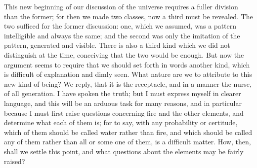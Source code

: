 \documentclass[11pt,letter]{article}
\begin{document}
\par  This new beginning of our discussion of the universe requires a fuller division than the former; for then we made two classes, now a third must be revealed. The two sufficed for the former discussion: one, which we assumed, was a pattern intelligible and always the same; and the second was only the imitation of the pattern, generated and visible. There is also a third kind which we did not distinguish at the time, conceiving that the two would be enough. But now the argument seems to require that we should set forth in words another kind, which is difficult of explanation and dimly seen. What nature are we to attribute to this new kind of being? We reply, that it is the receptacle, and in a manner the nurse, of all generation. I have spoken the truth; but I must express myself in clearer language, and this will be an arduous task for many reasons, and in particular because I must first raise questions concerning fire and the other elements, and determine what each of them is; for to say, with any probability or certitude, which of them should be called water rather than fire, and which should be called any of them rather than all or some one of them, is a difficult matter. How, then, shall we settle this point, and what questions about the elements may be fairly raised?
\end{document}
